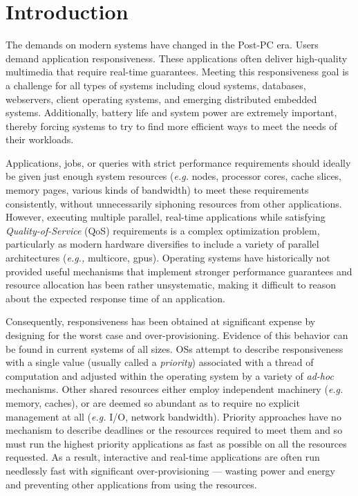 \section{Introduction}


The demands on modern systems have changed in the Post-PC era.  Users demand application responsiveness. These applications often deliver high-quality multimedia that require real-time guarantees.  Meeting this responsiveness goal is a challenge for all types of systems including cloud systems, databases, webservers, client operating systems, and emerging distributed embedded systems. Additionally, battery life and system power are extremely important, thereby forcing systems to try to find more efficient ways to meet the needs of their workloads.

Applications, jobs, or queries with strict performance requirements should ideally be given just enough system resources (\emph{e.g.} nodes, processor cores, cache slices, memory pages, various kinds of bandwidth) to meet these requirements consistently, without unnecessarily siphoning resources from other applications. However, executing multiple parallel, real-time applications while satisfying  \emph{Quality-of-Service} (QoS) requirements is a complex optimization problem, particularly as modern hardware diversifies to include a variety of parallel architectures (\emph{e.g.,} multicore, gpus).  Operating systems have historically not provided useful mechanisms that implement stronger performance guarantees and resource allocation has been rather unsystematic, making it difficult to reason about the expected response time of an application.

Consequently, responsiveness has been obtained at significant expense by designing for the worst case and over-provisioning.  Evidence of this behavior can be found in current systems of all sizes.  OSs attempt to describe responsiveness with a single value (usually called a \emph{priority}) associated with a thread of computation and adjusted within the operating system by a variety of \emph{ad-hoc} mechanisms. Other shared resources either employ independent machinery (\emph{e.g.} memory, caches), or are deemed so abundant as to require no explicit management at all (\emph{e.g.} I/O, network bandwidth).
 Priority approaches have no mechanism to describe deadlines or the resources required to meet them and so must run the highest priority applications as fast as possible on all the resources requested.   As a result, interactive and real-time applications are often run needlessly fast with significant over-provisioning --- wasting power and energy and preventing other applications from using the resources.

